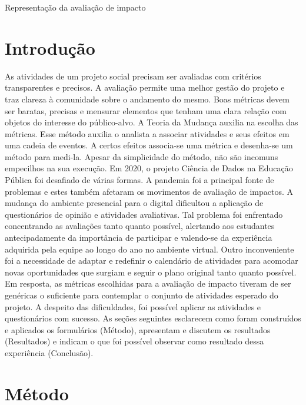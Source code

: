 \documentclass[
]{book}
\begin{document}
Representação da avaliação de impacto

\hypertarget{introduuxe7uxe3o}{%
\section{Introdução}\label{introduuxe7uxe3o}}

As atividades de um projeto social precisam ser avaliadas com critérios transparentes e precisos. A avaliação permite uma melhor gestão do projeto e traz clareza à comunidade sobre o andamento do mesmo. Boas métricas devem ser baratas, precisas e mensurar elementos que tenham uma clara relação com objetos do interesse do público-alvo. A Teoria da Mudança auxilia na escolha das métricas. Esse método auxilia o analista a associar atividades e seus efeitos em uma cadeia de eventos. A certos efeitos associa-se uma métrica e desenha-se um método para medi-la. Apesar da simplicidade do método, não são incomuns empecilhos na sua execução.
Em 2020, o projeto Ciência de Dados na Educação Pública foi desafiado de várias formas. A pandemia foi a principal fonte de problemas e estes também afetaram os movimentos de avaliação de impactos. A mudança do ambiente presencial para o digital dificultou a aplicação de questionários de opinião e atividades avaliativas. Tal problema foi enfrentado concentrando as avaliações tanto quanto possível, alertando aos estudantes antecipadamente da importância de participar e valendo-se da experiência adquirida pela equipe ao longo do ano no ambiente virtual. Outro inconveniente foi a necessidade de adaptar e redefinir o calendário de atividades para acomodar novas oportunidades que surgiam e seguir o plano original tanto quanto possível. Em resposta, as métricas escolhidas para a avaliação de impacto tiveram de ser genéricas o suficiente para contemplar o conjunto de atividades esperado do projeto.
A despeito das dificuldades, foi possível aplicar as atividades e questionários com sucesso. As seções seguintes esclarecem como foram construídos e aplicados os formulários (Método), apresentam e discutem os resultados (Resultados) e indicam o que foi possível observar como resultado dessa experiência (Conclusão).

\hypertarget{muxe9todo}{%
\section{Método}\label{muxe9todo}}
\end{document}
